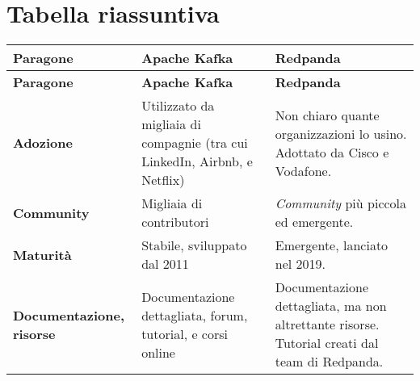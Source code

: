 \section{Tabella riassuntiva}

\begin{longtable}{|>{\centering\arraybackslash}p{}|>{\centering\arraybackslash}p{}|>{\centering\arraybackslash}p{}|}
	\hline
	\textbf{Paragone}                           & \textbf{Apache Kafka}                                                                                                                                       & \textbf{Redpanda}                                                                                                                                                      \\
	\hline
	\endfirsthead
	\hline
	\textbf{Paragone}                           & \textbf{Apache Kafka}                                                                                                                                       & \textbf{Redpanda}                                                                                                                                                      \\
	\endhead
	\hline
	\textbf{Adozione}                           & Utilizzato da migliaia di compagnie (tra cui LinkedIn, Airbnb, e Netflix)                                                                                   & Non chiaro quante organizzazioni lo usino. Adottato da Cisco e Vodafone.                                                                                               \\
	\hline
	\textbf{Community}                          & Migliaia di contributori                                                                                                                                    & \textit{Community} più piccola ed emergente.                                                                                                                           \\
	\hline
	\textbf{Maturità}                           & Stabile, sviluppato dal 2011                                                                                                                                & Emergente, lanciato nel 2019.                                                                                                                                          \\
	\hline
	\textbf{Documentazione, risorse}            & Documentazione dettagliata, forum, tutorial, e corsi online                                                                                                 & Documentazione dettagliata, ma non altrettante risorse. Tutorial creati dal team di Redpanda.                                                                          \\

\end{longtable}
